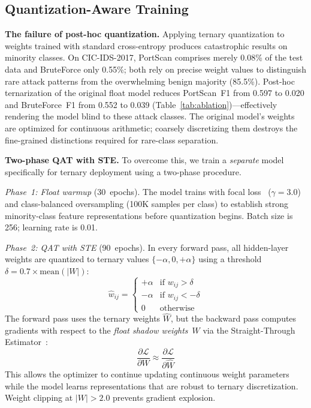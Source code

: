 \documentclass[sigconf,nonacm]{acmart}
\begin{document}
\subsection{Quantization-Aware Training}\label{sec:qat}

\textbf{The failure of post-hoc quantization.}
Applying ternary quantization to weights trained with standard
cross-entropy produces catastrophic results on minority classes.
On CIC-IDS-2017, PortScan comprises merely 0.08\% of the test data and
BruteForce only 0.55\%; both rely on precise weight values to
distinguish rare attack patterns from the overwhelming benign majority
(85.5\%).
Post-hoc ternarization of the original float model reduces PortScan~F1
from 0.597 to 0.020 and BruteForce~F1 from 0.552 to 0.039
(Table~\ref{tab:ablation})---effectively rendering the model blind to
these attack classes.
The original model's weights are optimized for continuous arithmetic;
coarsely discretizing them destroys the fine-grained distinctions
required for rare-class separation.

\textbf{Two-phase QAT with STE.}
To overcome this, we train a \emph{separate} model specifically for
ternary deployment using a two-phase procedure.

\emph{Phase~1: Float warmup} (30~epochs).
The model trains with focal loss~\cite{lin2017focal} ($\gamma = 3.0$)
and class-balanced oversampling (100K samples per class) to establish
strong minority-class feature representations before quantization
begins.
Batch size is 256; learning rate is 0.01.

\emph{Phase~2: QAT with STE} (90~epochs).
In every forward pass, all hidden-layer weights are quantized to ternary
values $\{-\alpha, 0, +\alpha\}$ using a threshold
$\delta = 0.7 \times \text{mean}(|W|)$:
\begin{equation}\label{eq:ternary}
\hat{w}_{ij} = \begin{cases}
+\alpha & \text{if } w_{ij} > \delta \\
-\alpha & \text{if } w_{ij} < -\delta \\
0       & \text{otherwise}
\end{cases}
\end{equation}
The forward pass uses the ternary weights $\hat{W}$, but the backward
pass computes gradients with respect to the \emph{float shadow
weights}~$W$ via the Straight-Through Estimator~\cite{bengio2013ste,
jacob2018quant}:
\begin{equation}\label{eq:ste}
\frac{\partial \mathcal{L}}{\partial W} \approx
\frac{\partial \mathcal{L}}{\partial \hat{W}}
\end{equation}
This allows the optimizer to continue updating continuous weight
parameters while the model learns representations that are robust to
ternary discretization.
Weight clipping at $|W| > 2.0$ prevents gradient explosion.
\end{document}
